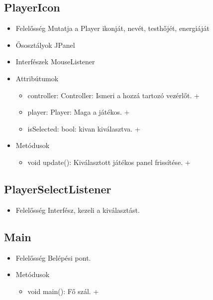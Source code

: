 \subsection{PlayerIcon}
\begin{itemize}
	\item Felelősség\newline
	Mutatja a Player ikonját, nevét, testhőjét, energiáját
	\item Ősosztályok\newline
	JPanel
	\item Interfészek\newline
	MouseListener
	\item Attribútumok\newline
	\begin{itemize}
		\item controller: Controller: Ismeri a hozzá tartozó vezérlőt. +	
		\item player: Player: Maga a játékos. +
		\item isSelected: bool: kivan kiválasztva. +
	\end{itemize}
	\item Metódusok\newline
	\begin{itemize}
		\item void update(): Kiválasztott játékos panel frissítése. +
	\end{itemize}
\end{itemize}

\subsection{PlayerSelectListener }
\begin{itemize}
	\item Felelősség\newline
	Interfész, kezeli a kiválasztást.
\end{itemize}

\subsection{Main}
\begin{itemize}
	\item Felelősség\newline
	Belépési pont.
	\item Metódusok\newline
	\begin{itemize}
		\item void main(): Fő szál. +
	\end{itemize}
\end{itemize}

